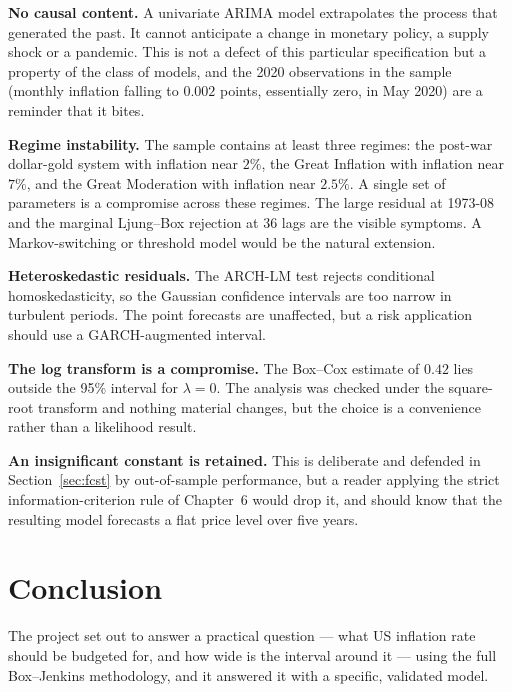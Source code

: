\textbf{No causal content.} A univariate ARIMA model extrapolates the process that
generated the past. It cannot anticipate a change in monetary policy, a supply
shock or a pandemic. This is not a defect of this particular specification but a
property of the class of models, and the 2020 observations in the sample
(monthly inflation falling to $0.002$ points, essentially zero, in May 2020) are a reminder that it bites.

\textbf{Regime instability.} The sample contains at least three regimes: the
post-war dollar-gold system with inflation near $2\%$, the Great Inflation with
inflation near $7\%$, and the Great Moderation with inflation near $2.5\%$. A
single set of parameters is a compromise across these regimes. The large residual
at 1973-08 and the marginal Ljung--Box rejection at 36 lags are the visible
symptoms. A Markov-switching or threshold model would be the natural extension.

\textbf{Heteroskedastic residuals.} The ARCH-LM test rejects conditional
homoskedasticity, so the Gaussian confidence intervals are too narrow in turbulent
periods. The point forecasts are unaffected, but a risk application should use a
GARCH-augmented interval.

\textbf{The log transform is a compromise.} The Box--Cox estimate of $0.42$ lies
outside the 95\% interval for $\lambda=0$. The analysis was checked under the
square-root transform and nothing material changes, but the choice is a
convenience rather than a likelihood result.

\textbf{An insignificant constant is retained.} This is deliberate and defended in
Section~\ref{sec:fcst} by out-of-sample performance, but a reader applying the
strict information-criterion rule of Chapter~6 would drop it, and should know that
the resulting model forecasts a flat price level over five years.

\section{Conclusion}
\label{sec:conclusion}

The project set out to answer a practical question --- what US inflation rate
should be budgeted for, and how wide is the interval around it --- using the full
Box--Jenkins methodology, and it answered it with a specific, validated model.

